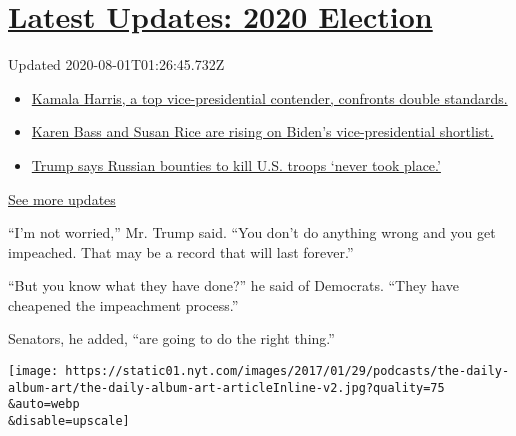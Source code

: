 \hypertarget{latest-updates-2020-election}{%
\section{\texorpdfstring{\href{https://www.nytimes.com/2020/07/31/us/elections/biden-vs-trump.html?action=click\&pgtype=Article\&state=default\&region=MAIN_CONTENT_1\&context=storylines_live_updates}{Latest
Updates: 2020
Election}}{Latest Updates: 2020 Election}}\label{latest-updates-2020-election}}

Updated 2020-08-01T01:26:45.732Z

\begin{itemize}
\tightlist
\item
  \href{https://www.nytimes.com/2020/07/31/us/elections/biden-vs-trump.html?action=click\&pgtype=Article\&state=default\&region=MAIN_CONTENT_1\&context=storylines_live_updates\#link-29fdff45}{Kamala
  Harris, a top vice-presidential contender, confronts double
  standards.}
\item
  \href{https://www.nytimes.com/2020/07/31/us/elections/biden-vs-trump.html?action=click\&pgtype=Article\&state=default\&region=MAIN_CONTENT_1\&context=storylines_live_updates\#link-13ec3d9c}{Karen
  Bass and Susan Rice are rising on Biden's vice-presidential
  shortlist.}
\item
  \href{https://www.nytimes.com/2020/07/31/us/elections/biden-vs-trump.html?action=click\&pgtype=Article\&state=default\&region=MAIN_CONTENT_1\&context=storylines_live_updates\#link-49e9a016}{Trump
  says Russian bounties to kill U.S. troops `never took place.'}
\end{itemize}

\href{https://www.nytimes.com/2020/07/31/us/elections/biden-vs-trump.html?action=click\&pgtype=Article\&state=default\&region=MAIN_CONTENT_1\&context=storylines_live_updates}{See
more updates}

``I'm not worried,'' Mr. Trump said. ``You don't do anything wrong and
you get impeached. That may be a record that will last forever.''

``But you know what they have done?'' he said of Democrats. ``They have
cheapened the impeachment process.''

Senators, he added, ``are going to do the right thing.''

\texttt{[image: https://static01.nyt.com/images/2017/01/29/podcasts/the-daily-album-art/the-daily-album-art-articleInline-v2.jpg?quality=75\\\&auto=webp\\\&disable=upscale]}

